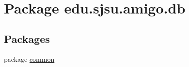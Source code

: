 \hypertarget{namespaceedu_1_1sjsu_1_1amigo_1_1db}{}\section{Package edu.\+sjsu.\+amigo.\+db}
\label{namespaceedu_1_1sjsu_1_1amigo_1_1db}
\subsection*{Packages}
\begin{DoxyCompactItemize}
\item 
package \hyperlink{namespaceedu_1_1sjsu_1_1amigo_1_1db_1_1common}{common}
\end{DoxyCompactItemize}
